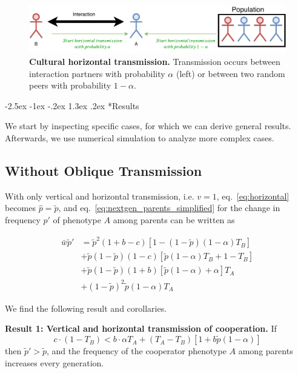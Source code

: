 \documentclass[12pt]{extarticle}
\makeatletter
\renewcommand\section{\@startsection {section}{1}{\z@}%
     {-2.5ex \@plus -1ex \@minus -.2ex}%
     {1.3ex \@plus.2ex}%
    {\Large\bfseries}}
\makeatother
\begin{document}
\begin{figure}[b]
  \centering
  \includegraphics[scale=1]{figure1.pdf}
  \caption{\textbf{Cultural horizontal transmission.} Transmission occurs between interaction partners with probability $\alpha$ (left) or between two random peers with probability $1-\alpha$.}
  \label{fig:horizontal}
\end{figure}

\section*{Results}

We start by inspecting specific cases, for which we can derive general results. 
Afterwards, we use numerical simulation to analyze more complex cases.

\subsection*{Without Oblique Transmission}

With only vertical and horizontal transmission, i.e. $v=1$, eq.~\ref{eq:horizontal} becomes
$\hat{p} =  \tilde{p}$,
and eq.~\ref{eq:nextgen_parents_simplified} for the change in frequency $p'$ of phenotype $A$ among parents can be written as

\begin{equation} 
\begin{split}\label{eq:nextgen_parents_vertical_only}
\bar{w} \tilde{p}' 
& = \tilde{p}^2 (1+b-c) [1 - (1-\tilde{p}) (1-\alpha) T_B] \\
& + \tilde{p}(1-\tilde{p}) (1-c) [\tilde{p} (1-\alpha) T_B + 1 - T_B] \\
& + \tilde{p}(1-\tilde{p}) (1+b) [\tilde{p} (1-\alpha) + \alpha] T_A \\
& + (1-\tilde{p})^2 \tilde{p} (1-\alpha) T_A
\end{split}
\end{equation}

We find the following result and corollaries.

\textbf{Result 1: Vertical and horizontal transmission of cooperation.}
If 
\begin{equation} \label{eq:unequal_transmission}
c \cdot (1-T_B) < b \cdot  \alpha T_A  + (T_A - T_B) [1 + b\tilde{p}(1-\alpha)]
\end{equation}
then $\tilde{p}' > \tilde{p}$, and the frequency of the cooperator phenotype $A$ among parents increases every generation.
\end{document}
